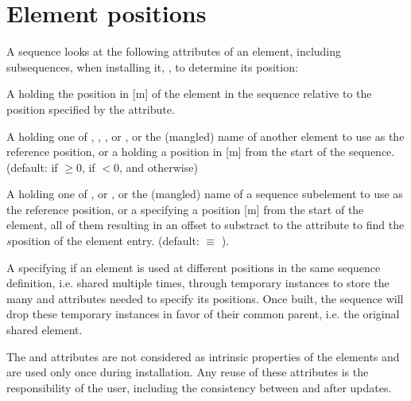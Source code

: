 \documentclass[letterpaper,10pt,english]{sphinxmanual}
\begin{document}
\section{Element positions}
\label{\detokenize{sequences:element-positions}}
\sphinxAtStartPar
A sequence looks at the following attributes of an element, including sub\sphinxhyphen{}sequences, when installing it, , to determine its position:
\begin{description}
\sphinxAtStartPar
A  holding the position in {[}m{]} of the element in the sequence relative to the position specified by the  attribute.

\sphinxAtStartPar
A  holding one of , , ,  or , or the (mangled) name of another element to use as the reference position,
or a  holding a position in {[}m{]} from the start of the sequence. (default:  if \(\geq 0\),  if \(<0\), and 
otherwise)

\sphinxAtStartPar
A  holding one of ,  or ,  or the (mangled) name of a sequence sub\sphinxhyphen{}element to use as the reference position,
or a  specifying a position {[}m{]} from the start of the element, all of them resulting in an offset to substract to the  attribute to find the
\(s\)\sphinxhyphen{}position of the element entry. (default:  \(\equiv\) ).

\sphinxAtStartPar
A  specifying if an element is used at different positions in the same sequence definition, i.e. shared multiple times,
through temporary instances to store the many  and  attributes needed to specify its positions.
Once built, the sequence will drop these temporary instances in favor of their common parent, i.e. the original shared element.

\sphinxAtStartPar
The  and  attributes are not considered as intrinsic properties of the elements and are used only once during installation.
Any reuse of these attributes is the responsibility of the user, including the consistency between  and  after updates.

\end{description}
\end{document}
